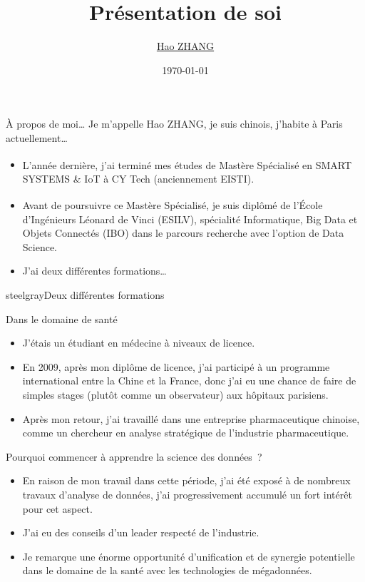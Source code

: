 \documentclass{beamer}
\title{Présentation de soi}
\author{\href{mailto:haozhang@me.com}{Hao ZHANG}}
\date{\today}
\begin{document}
	\maketitle
	
	
	\begin{frame}{À propos de moi…}
		Je m'appelle Hao ZHANG,  je suis chinois, j'habite à Paris actuellement…
		\begin{itemize}
			\item L'année dernière, j'ai terminé mes études de Mastère Spécialisé\textsuperscript{\textregistered} en SMART SYSTEMS \& IoT à CY Tech (anciennement EISTI).
			\item Avant de poursuivre ce Mastère Spécialisé\textsuperscript{\textregistered}, je suis diplômé de l'École d'Ingénieurs Léonard de Vinci (ESILV), spécialité Informatique, Big Data et Objets Connectés (IBO) dans le parcours recherche avec l'option de Data Science.
			\item J'ai deux différentes formations…
		\end{itemize}
	\end{frame}
	
	\begin{chapter}{steelgray}{Deux différentes formations}
	\end{chapter}
	
	\begin{frame}[fragile]{Dans le domaine de santé}
		\begin{itemize}[<+->]
			\item J'étais un étudiant en médecine à niveaux de licence.
			\item En 2009, après mon diplôme de licence, j'ai participé à un programme international entre la Chine et la France, donc j'ai eu une chance de faire de simples stages (plutôt comme un observateur) aux hôpitaux parisiens.
			\item Après mon retour, j'ai travaillé dans une entreprise pharmaceutique chinoise, comme un chercheur en analyse stratégique de l'industrie pharmaceutique.
		\end{itemize}
	\end{frame}
	
	\begin{frame}[fragile]{Pourquoi commencer à apprendre la science des données ?}
		\begin{itemize}[<+->]
			\item En raison de mon travail dans cette période, j'ai été exposé à de nombreux travaux d'analyse de données, j'ai progressivement accumulé un fort intérêt pour cet aspect.
			\item J'ai eu des conseils d'un leader respecté de l'industrie.
			\item Je remarque une énorme opportunité d'unification et de synergie potentielle dans le domaine de la santé avec les technologies de mégadonnées.
		\end{itemize}
	\end{frame}
	
\end{document}
